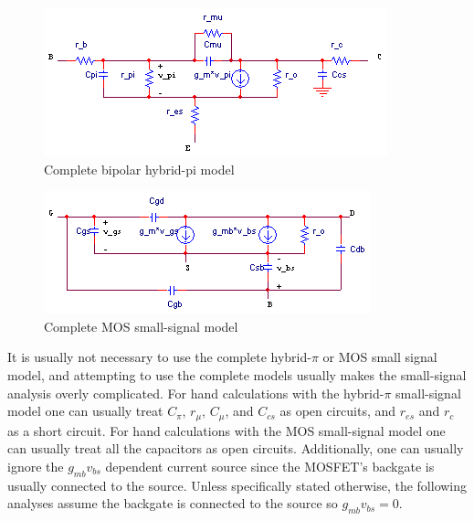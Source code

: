 \begin{figure}[h]
	\centering
		\includegraphics{schematics/complete_bipolar_hybrid_pi.PNG}
	\caption{Complete bipolar hybrid-pi model}
	\label{fig:complete_bipolar_hybrid_pi}
\end{figure}
\begin{figure}[h]
	\centering
		\includegraphics{schematics/complete_MOS_ss_model.PNG}
	\caption{Complete MOS small-signal model}
	\label{fig:complete_MOS_ss_model}
\end{figure}

It is usually not necessary to use the complete hybrid-$\pi$ or MOS small signal model, and attempting to use the complete models usually makes the small-signal analysis overly complicated.
For hand calculations with the hybrid-$\pi$ small-signal model one can usually treat $C_{\pi}$, $r_{\mu}$, $C_{\mu}$, and $C_{cs}$ as open circuits, and $r_{es}$ and $r_{c}$ as a short circuit.
For hand calculations with the MOS small-signal model one can usually treat all the capacitors as open circuits.
Additionally, one can usually ignore the $g_{mb}v_{bs}$ dependent current source since the MOSFET's backgate is usually connected to the source.
Unless specifically stated otherwise, the following analyses assume the backgate is connected to the source so $g_{mb}v_{bs} = 0$.

